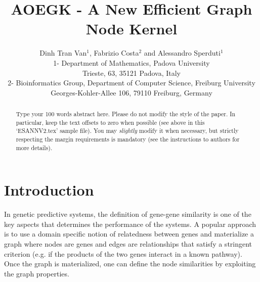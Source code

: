 \documentclass{esannV2}
\begin{document}
\title{AOEGK - A New Efficient Graph Node Kernel}

\author{Dinh Tran Van$^1$, Fabrizio Costa$^2$ and Alessandro Sperduti$^1$
%
%
\vspace{.3cm}\\
%
1- Department of Mathematics, Padova University\\
Trieste, 63, 35121 Padova, Italy
%
\vspace{.1cm}\\
2- Bioinformatics Group, Department of Computer Science, Freiburg University \\
Georges-Kohler-Allee 106, 79110 Freiburg, Germany\\
}

\maketitle

\begin{abstract}
Type your 100 words abstract here. Please do not modify the style
of the paper. In particular, keep the text offsets to zero when
possible (see above in this `ESANNV2.tex' sample file). You may
\emph{slightly} modify it when necessary, but strictly respecting
the margin requirements is mandatory (see the instructions to
authors for more details).
\end{abstract}

\section{Introduction} \label{introduction}
In genetic predictive systems, the definition of gene-gene similarity is one of the key aspects that determines the performance of the systems. 
A popular approach is to use a domain specific notion of relatedness between genes and materialize a graph where nodes are genes and edges are relationships that satisfy a stringent criterion (e.g. if the products of the two genes interact in a known pathway). 
Once the graph is materialized, one can define the node similarities by exploiting the graph properties.
\end{document}
